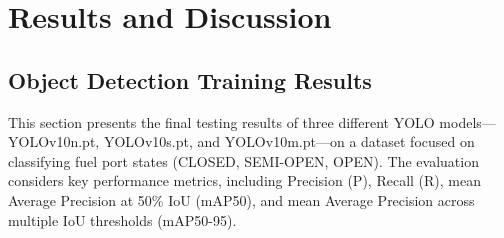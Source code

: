 \documentclass[12pt,oneside]{book} %
\begin{document}
\chapter{Results and Discussion}\label{chap:results}

\section{Object Detection Training Results}

This section presents the final testing results of three different YOLO
models—YOLOv10n.pt, YOLOv10s.pt, and YOLOv10m.pt—on a dataset focused on
classifying fuel port states (CLOSED, SEMI-OPEN, OPEN). The evaluation
considers key performance metrics, including Precision (P), Recall (R), mean
Average Precision at 50\% IoU (mAP50), and mean Average Precision across
multiple IoU thresholds (mAP50-95).
\end{document}
